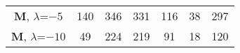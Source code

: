 \begin{table}[t]
\begin{center}
{\begin{tabular}[t]{ccccccc}
	\textbf{M}, $\lambda$=$-5$ 		& 140          & 346   	 & 331		& 116    	& 38   & 297	   \\
	
	\textbf{M}, $\lambda$=$-10$		& 49          & 224 	 & 219		& 91  		& 18   & 120	   \\
	\bottomrule
	
\end{tabular} 
}

\label{tab:Size}

\end{center}
\end{table}











\cleardoublepage

